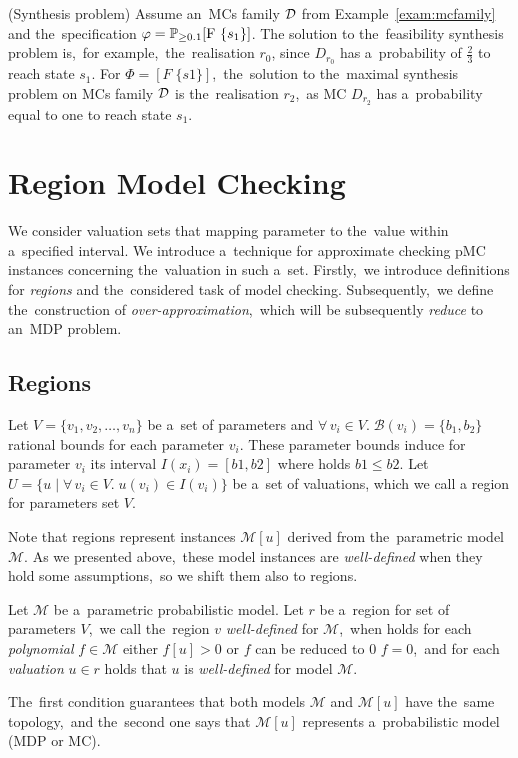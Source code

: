 \begin{example} (Synthesis problem)
Assume an~MCs family $\mathcal{D}$ from Example~\ref{exam:mcfamily} and the~specification $\varphi = \mathbb{P}_{\geq 0.1}[\mathrm{F}\ \{s_1\}]$.
The solution to the~feasibility synthesis problem is,~for example,~the~realisation $r_0$, since $D_{r_0}$ has a~probability of $\frac{2}{3}$ to reach state $s_1$.
For $\varPhi = [F \; \{s1\}]$,~the~solution to the~maximal synthesis problem on MCs family $\mathcal{D}$ is the~realisation $r_2$,~as MC $D_{r_2}$ has a~probability equal to one to reach state $s_1$.
\end{example}

\section{Region Model Checking}
We consider valuation sets that mapping parameter to the~value within a~specified interval. 
We introduce a~technique for approximate checking pMC instances concerning the~valuation in such a~set.
Firstly,~we introduce definitions for \textit{regions} and the~considered task of model checking.
Subsequently,~we define the~construction of \textit{over-approximation},~which will be subsequently \textit{reduce} to an~MDP problem.

\subsection{Regions}
\begin{definition}[Region]
Let $V = \{ v_1, v_2, \dots, v_n \}$ be a~set of parameters and $\forall \, v_i \in V. \; \mathcal{B}(v_i) = \{b_1, b_2 \}$ rational bounds for each parameter $v_i$.
These parameter bounds induce for parameter $v_i$ its interval $I(x_i) = [b1, b2]$ where holds $b1 \leq b2$.
Let $U = \{ u \; \lvert \; \forall \, v_i \in V. \; u(v_i) \in I(v_i) \}$ be a~set of valuations, which we call a region for parameters set $V$.
\end{definition}
\noindent
Note that regions represent instances $\mathcal{M}[u]$ derived from the~parametric model $\mathcal{M}$.
As we presented above,~these model instances are \textit{well-defined} when they hold some assumptions,~so we shift them also to regions.

\begin{definition}
Let $\mathcal{M}$ be a~parametric probabilistic model.
Let $r$ be a~region for set of parameters $V$,~we call the~region $v$ \textit{well-defined} for $\mathcal{M}$,~when holds for each \textit{polynomial} $f \in \mathcal{M}$ either $f[u] > 0$ or  $f$ can be reduced to 0 $f = 0$,~and for each \textit{valuation} $u \in r$ holds that $u$ is \textit{well-defined} for model $\mathcal{M}$.
\end{definition}
\noindent
The~first condition guarantees that both models $\mathcal{M}$ and $\mathcal{M}[u]$ have the~same topology,~and the~second one says that $\mathcal{M}[u]$ represents a~probabilistic model (MDP or MC).

